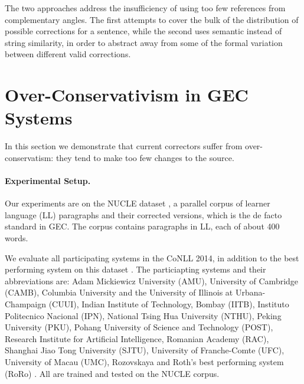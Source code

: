 \documentclass[letter,11pt]{article}
\begin{document}
The two approaches address the insufficiency of using too few references from
complementary angles. 
The first attempts to cover the bulk of the distribution of possible
corrections for a sentence, while the second
uses semantic instead of string similarity, in order to abstract away
from some of the formal variation between different valid corrections.



\section{Over-Conservativism in GEC Systems}\label{sec:formal_conservatism}



In this section we demonstrate that current correctors
suffer from over-conservatism: they tend to make too few changes to the source. 


\paragraph{Experimental Setup.}\label{par:experimental_setup}

Our experiments are on the NUCLE dataset \cite{dahlmeier2013building},
a parallel corpus of learner language (LL) paragraphs and their corrected versions,
which is the de facto standard in GEC.
The corpus contains paragraphs in LL, each of about 400 words.

We evaluate all participating systems in the CoNLL 2014,
in addition to the best performing system on this dataset \cite{rozovskaya2014building}.
The particiapting systems and their abbreviations are: Adam Mickiewicz University (AMU),
University of Cambridge (CAMB), Columbia University and the University of Illinois at Urbana-Champaign (CUUI),
Indian Institute of Technology, Bombay (IITB), Instituto Politecnico Nacional (IPN),
National Tsing Hua University (NTHU), Peking University (PKU), Pohang University of Science and Technology (POST),
Research Institute for Artificial Intelligence, Romanian Academy (RAC), Shanghai Jiao Tong University (SJTU),
University of Franche-Comte (UFC), University of Macau (UMC),
Rozovskaya and Roth's best performing system (RoRo) \cite{rozovskaya2016grammatical}.
All are trained and tested on the NUCLE corpus.
\end{document}
